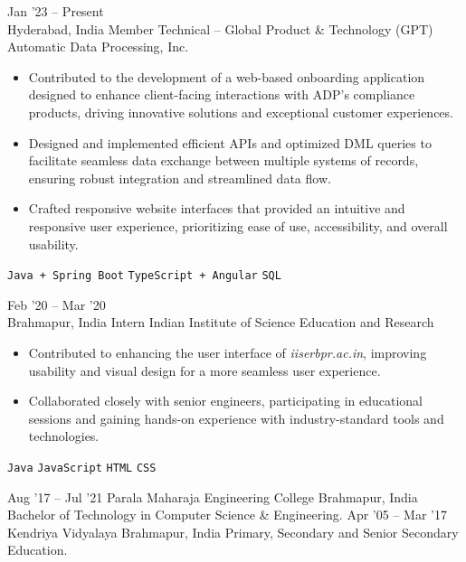 \documentclass[9pt]{util} %
\begin{document}
\vspace{-10 pt}

\begin{entrylist}
	\entry
	{{Jan '23 -- Present} \\\footnotesize{Hyderabad, India}}
	{Member Technical -- Global Product \& Technology (GPT)}
	{Automatic Data Processing, Inc.}
	{\vspace{-10pt}
		\begin{itemize}[noitemsep,topsep=0pt,parsep=0pt,partopsep=0pt, leftmargin=-1pt]
			\item Contributed to the development of a web-based onboarding application designed to enhance client-facing interactions with ADP's compliance products, driving innovative solutions and exceptional customer experiences.
			\item Designed and implemented efficient APIs and optimized DML queries to facilitate seamless data exchange between multiple systems of records, ensuring robust integration and streamlined data flow.
			\item Crafted responsive website interfaces that provided an intuitive and responsive user experience, prioritizing ease of use, accessibility, and overall usability.
		\end{itemize}
		\texttt{Java + Spring Boot} \slashsep \texttt{TypeScript + Angular} \slashsep \texttt{SQL}}
	\entry
	{{Feb '20 -- Mar '20} \\\footnotesize{Brahmapur, India}}
	{Intern}
	{Indian Institute of Science Education and Research}
	{\vspace{-10pt}
		\begin{itemize}[noitemsep,topsep=0pt,parsep=0pt,partopsep=0pt, leftmargin=-1pt]
			\item Contributed to enhancing the user interface of \textit{iiserbpr.ac.in}, improving usability and visual design for a more seamless user experience.
			\item Collaborated closely with senior engineers, participating in educational sessions and gaining hands-on experience with industry-standard tools and technologies.
		\end{itemize}
		\texttt{Java} \slashsep \texttt{JavaScript} \slashsep \texttt{HTML} \slashsep \texttt{CSS}}
\end{entrylist}

\vspace{-10 pt}

\begin{entrylist}
	\entry
	{Aug '17 -- Jul '21}
	{Parala Maharaja Engineering College}
	{Brahmapur, India}
	{Bachelor of Technology in Computer Science \& Engineering.}
	\entry
	{Apr '05 -- Mar '17}
	{Kendriya Vidyalaya}
	{Brahmapur, India}
	{Primary, Secondary and Senior Secondary Education.}
\end{entrylist}
\end{document}

